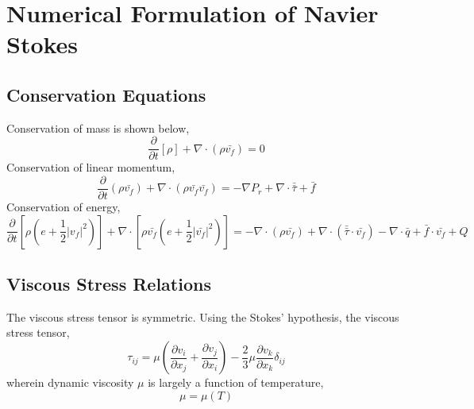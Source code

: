 \documentclass[a4paper, 12pt]{report}
\begin{document}
\begin{center}

\section{}
\begin{comment}
\end{comment}

\subsection{}
\begin{comment}
\end{comment}

\section{Numerical Formulation of Navier Stokes}
\begin{comment}
\end{comment}

\subsection{Conservation Equations}
\begin{comment}
\end{comment}
Conservation of mass is shown below,
$$\frac{\partial}{\partial t}[\rho] + \nabla \cdot(\rho \bar{v_{f}}) = 0$$
Conservation of linear momentum,
$$\frac{\partial}{\partial t}(\rho \bar{v_{f}}) + \nabla \cdot(\rho \bar{v_{f}}\bar{v_{f}}) = -\nabla P_{r} + \nabla \cdot \bar{\bar{\tau}} + \bar{f}$$
Conservation of energy,
$$\frac{\partial}{\partial t}\left[\rho\left(e+\frac{1}{2}|v_{f}|^{2}\right)\right] + \nabla \cdot\left[\rho \bar{v_{f}}\left(e + \frac{1}{2}|\bar{v_{f}}|^{2}\right)\right] = -\nabla \cdot(\rho\bar{v_{f}}) + \nabla \cdot(\bar{\bar{\tau}}\cdot \bar{v_{f}}) - \nabla \cdot\bar{q} + \bar{f}\cdot\bar{v_{f}} + Q$$

\subsection{Viscous Stress Relations}
\begin{comment}
\end{comment}
The viscous stress tensor is symmetric. Using the Stokes' hypothesis, the viscous stress tensor,
$$\tau_{ij} = \mu\left(\frac{\partial v_{i}}{\partial x_{j}} + \frac{\partial v_{j}}{\partial x_{i}}\right) - \frac{2}{3}\mu\frac{\partial v_{k}}{\partial x_{k}}\delta_{ij}$$
wherein dynamic viscosity $\mu$ is largely a function of temperature,
$$\mu = \mu(T)$$


\end{center}
\end{document}
